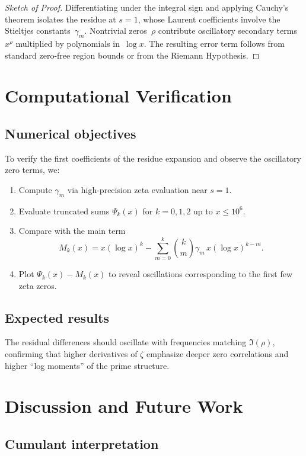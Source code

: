 \documentclass[12pt]{amsart}
\begin{document}
\begin{proof}[Sketch of Proof]
Differentiating under the integral sign and applying Cauchy’s theorem isolates the residue at $s=1$, whose Laurent coefficients involve the Stieltjes constants~$\gamma_m$. Nontrivial zeros~$\rho$ contribute oscillatory secondary terms $x^{\rho}$ multiplied by polynomials in~$\log x$.
The resulting error term follows from standard zero-free region bounds or from the Riemann Hypothesis.
\end{proof}

\section{Computational Verification}

\subsection{Numerical objectives}
To verify the first coefficients of the residue expansion and observe the oscillatory zero terms, we:
\begin{enumerate}
    \item Compute $\gamma_m$ via high-precision zeta evaluation near $s=1$.
    \item Evaluate truncated sums $\Psi_k(x)$ for $k=0,1,2$ up to $x\le10^6$.
    \item Compare with the main term
    \[
    M_k(x)=x(\log x)^k-\sum_{m=0}^{k}\binom{k}{m}\gamma_m\,x(\log x)^{k-m}.
    \]
    \item Plot $\Psi_k(x)-M_k(x)$ to reveal oscillations corresponding to the first few zeta zeros.
\end{enumerate}

\subsection{Expected results}
The residual differences should oscillate with frequencies matching $\Im(\rho)$, confirming that higher derivatives of $\zeta$ emphasize deeper zero correlations and higher ``log moments'' of the prime structure.

\section{Discussion and Future Work}

\subsection{Cumulant interpretation}
\end{document}
